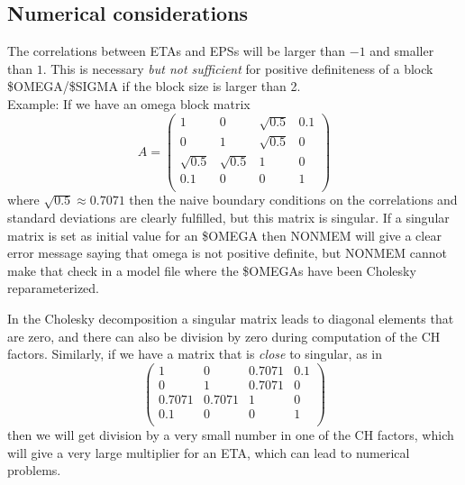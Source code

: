 \subsection{Numerical considerations}
The correlations between ETAs and EPSs will be larger than $-1$ and smaller than $1$. This is necessary \emph{but not sufficient}
for positive definiteness of a block \$OMEGA/\$SIGMA if the block size is larger than 2.\\
Example: If we have an omega block matrix
\[
A=
\left(
\begin{array}{cccc}
1          & 0          & \sqrt{0.5} & 0.1\\
0          & 1          & \sqrt{0.5} & 0\\
\sqrt{0.5} & \sqrt{0.5} & 1          & 0\\
0.1        & 0          & 0          & 1\\
\end{array}
\right)
\]
where $\sqrt{0.5}\approx 0.7071$
then the naive boundary conditions on the correlations and standard deviations are clearly fulfilled, but this matrix is singular.
If a singular matrix is set as initial value for an \$OMEGA then NONMEM will give a clear error message saying that omega is not positive definite, but NONMEM cannot make that check in a model file where the \$OMEGAs have been Cholesky reparameterized.

In the Cholesky decomposition a singular matrix leads to diagonal elements that are zero, and there can also be division by zero during computation of the CH factors. Similarly, if we have a matrix that is \emph{close} to singular, as in
\[
\left(
\begin{array}{cccc}
1          & 0          & 0.7071     & 0.1\\
0          & 1          & 0.7071     & 0\\
0.7071     & 0.7071     & 1          & 0\\
0.1        & 0          & 0          & 1\\
\end{array}
\right)
\]
then we will get division by a very small number in one of the CH factors, which will give a very large multiplier for an ETA, which can lead to numerical problems.

